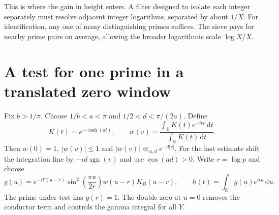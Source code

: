 \documentclass[11pt]{article}
\newcommand{\R}{\mathbb R}\newcommand{\C}{\mathbb C}
\newcommand{\dd}{\,\mathrm d}
\begin{document}
This is where the gain in height enters. A filter designed to isolate each integer separately must resolve adjacent integer logarithms, separated by about $1/X$. For identification, any one of many distinguishing primes suffices. The sieve pays for nearby prime pairs on average, allowing the broader logarithmic scale $\log X/X$.

\section{A test for one prime in a translated zero window}
Fix $b>1/\pi$. Choose $1/b<a<\pi$ and
$1/2<d<\pi/(2a)$. Define
\[
 K(t)=e^{-\cosh(at)},\qquad
 w(v)=\frac{\int_\R K(t)e^{-itv}\dd t}{\int_\R K(t)\dd t}.
\]
Then $w(0)=1$, $|w(v)|\le1$ and $|w(v)|\ll_{a,d}e^{-d|v|}$. For the last estimate shift the integration line by $-id\operatorname{sgn}(v)$ and use $\cos(ad)>0$. Write $r=\log p$ and choose
\begin{equation}\label{eq:test}
 g(u)=e^{-iY(u-r)}
       \sin^2\!\left(\frac{\pi u}{2r}\right)w(u-r)K_B(u-r),
 \qquad h(t)=\int_\R g(u)e^{itu}\dd u .
\end{equation}
The prime under test has $g(r)=1$. The double zero at $u=0$ removes the conductor term and controls the gamma integral for all $Y$.
\end{document}
